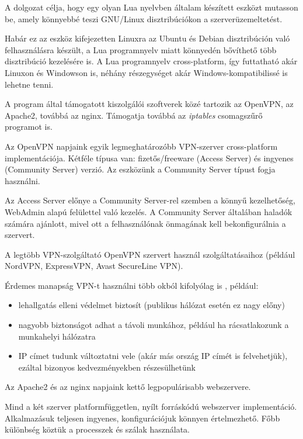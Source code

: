 
A dolgozat célja, hogy egy olyan Lua nyelvben általam készített eszközt mutasson be, amely könnyebbé teszi GNU/Linux disztribúciókon a szerverüzemeltetést.

Habár ez az eszköz kifejezetten Linuxra az Ubuntu és Debian disztribúción való felhasználásra készült, a Lua programnyelv miatt könnyedén bővíthető több disztribúció kezelésére is. A Lua programnyelv cross-platform, így futtatható akár Linuxon és Windowson is, néhány részegységet akár Windows-kompatibilissé is lehetne tenni.

A program által támogatott kiszolgálói szoftverek közé tartozik az OpenVPN, az Apache2, továbbá az nginx. Támogatja továbbá az \textit{iptables} csomagszűrő programot is.

\medskip

Az OpenVPN napjaink egyik legmeghatározóbb VPN-szerver cross-platform implementációja. Kétféle típusa van: fizetős/freeware (Access Server) és ingyenes (Community Server) verzió. Az eszközünk a Community Server típust fogja használni.

Az Access Server előnye a Community Server-rel szemben a könnyű kezelhetőség, WebAdmin alapú felülettel való kezelés. 
A Community Server általában haladók számára ajánlott, mivel ott a felhasználónak önmagának kell bekonfigurálnia a szervert.

A legtöbb VPN-szolgáltató OpenVPN szervert használ szolgáltatásaihoz (például NordVPN, ExpressVPN, Avast SecureLine VPN). \cite{whatisopenvpn}

Érdemes manapság VPN-t használni több okból kifolyólag is \cite{usageofvpn}, például:
\begin{itemize}
  \item lehallgatás elleni védelmet biztosít (publikus hálózat esetén ez nagy előny)
  \item nagyobb biztonságot adhat a távoli munkához, például ha rácsatlakozunk a munkahelyi hálózatra
  \item IP címet tudunk változtatni vele (akár más ország IP címét is felvehetjük), ezáltal bizonyos kedvezményekben részesülhetünk
\end{itemize}

\medskip
Az Apache2 és az nginx napjaink kettő legpopulárisabb webszervere. \cite{webservermarketshare}

Mind a két szerver platformfüggetlen, nyílt forráskódú webszerver implementáció. Alkalmazásuk teljesen ingyenes, konfigurációjuk könnyen értelmezhető. Főbb különbség köztük a processzek és szálak használata.

